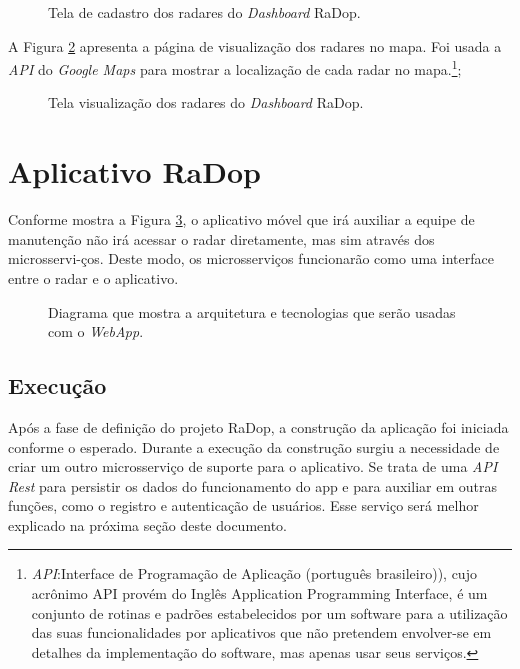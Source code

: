 \begin{figure}[H]
	\caption{\label{fig:radar} Tela de cadastro dos radares do \textit{Dashboard} RaDop.}
\end{figure}

A Figura \ref{fig:mapa} apresenta a página de visualização dos radares no mapa. Foi usada a \textit{API} do \textit{Google Maps} para mostrar a localização de cada radar no mapa.\footnote{\textit{API}:Interface de Programação de Aplicação (português brasileiro)), cujo acrônimo API provém do Inglês Application Programming Interface, é um conjunto de rotinas e padrões estabelecidos por um software para a utilização das suas funcionalidades por aplicativos que não pretendem envolver-se em detalhes da implementação do software, mas apenas usar seus serviços.};

\begin{figure}[H]
	\caption{\label{fig:mapa} Tela visualização dos radares do \textit{Dashboard} RaDop.}
\end{figure}

\section{Aplicativo RaDop}

Conforme mostra a Figura \ref{fig:diagrama-arq-webApp}, o aplicativo móvel que irá auxiliar a equipe de manutenção não irá acessar o radar diretamente, mas sim através dos microsservi-ços. Deste modo, os microsserviços funcionarão como uma interface entre o radar e o aplicativo.

\begin{figure}[H]
	\caption{\label{fig:diagrama-arq-webApp} Diagrama que mostra a arquitetura e tecnologias que serão usadas com o \textit{WebApp}.}
\end{figure}

\subsection{Execução}

Após a fase de definição do projeto RaDop, a construção da aplicação foi iniciada conforme o esperado. Durante a execução da construção surgiu a necessidade de criar um outro microsserviço de suporte para o aplicativo. Se trata de uma \textit{API Rest} para persistir os dados do funcionamento do app e para auxiliar em outras funções, como o registro e autenticação de usuários. Esse serviço será melhor explicado na próxima seção deste documento.

